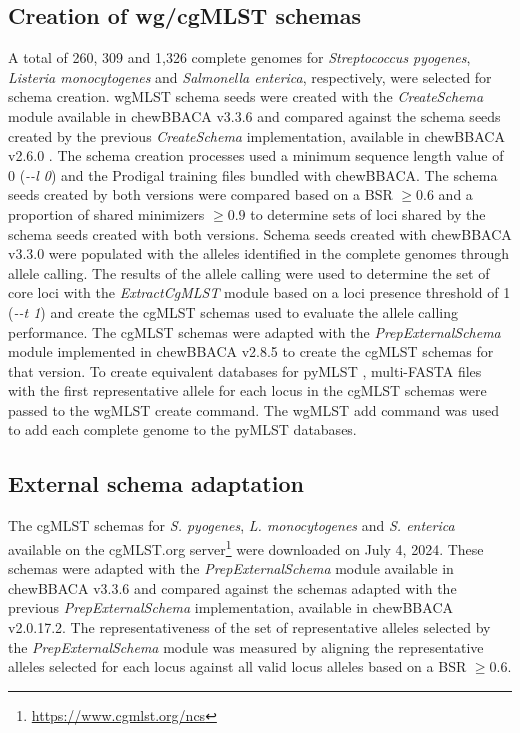 \subsection{Creation of wg/cgMLST schemas} \label{ssec:ch2_methods_ssec3}

A total of 260, 309 and 1,326 complete genomes for \textit{Streptococcus pyogenes}, \textit{Listeria monocytogenes} and \textit{Salmonella enterica}, respectively, were selected for schema creation. \ac{wgMLST} schema seeds were created with the \textit{CreateSchema} module available in chewBBACA v3.3.6 and compared against the schema seeds created by the previous \textit{CreateSchema} implementation, available in chewBBACA v2.6.0 \citep{silva_chewbbaca_2018}. The schema creation processes used a minimum sequence length value of 0 (\textit{-{}-l 0}) and the Prodigal \citep{hyatt_prodigal_2010} training files bundled with chewBBACA. The schema seeds created by both versions were compared based on a \ac{BSR} $\geq0.6$ and a proportion of shared minimizers $\geq0.9$ to determine sets of loci shared by the schema seeds created with both versions. Schema seeds created with chewBBACA v3.3.0 were populated with the alleles identified in the complete genomes through allele calling. The results of the allele calling were used to determine the set of core loci with the \textit{ExtractCgMLST} module based on a loci presence threshold of 1 (\textit{-{}-t 1}) and create the \ac{cgMLST} schemas used to evaluate the allele calling performance. The \ac{cgMLST} schemas were adapted with the \textit{PrepExternalSchema} module implemented in chewBBACA v2.8.5 to create the \ac{cgMLST} schemas for that version. To create equivalent databases for pyMLST \citep{biguenet_introduction_2023}, multi-FASTA files with the first representative allele for each locus in the \ac{cgMLST} schemas were passed to the \ac{wgMLST} create command. The \ac{wgMLST} add command was used to add each complete genome to the pyMLST databases.

\subsection{External schema adaptation} \label{ssec:ch2_methods_ssec4}

The \ac{cgMLST} schemas for \textit{S. pyogenes}, \textit{L. monocytogenes} and \textit{S. enterica} available on the cgMLST.org server\footnote{\url{https://www.cgmlst.org/ncs}} were downloaded on July 4, 2024. These schemas were adapted with the \textit{PrepExternalSchema} module available in chewBBACA v3.3.6 and compared against the schemas adapted with the previous \textit{PrepExternalSchema} implementation, available in chewBBACA v2.0.17.2. The representativeness of the set of representative alleles selected by the \textit{PrepExternalSchema} module was measured by aligning the representative alleles selected for each locus against all valid locus alleles based on a \ac{BSR} $\geq0.6$.

